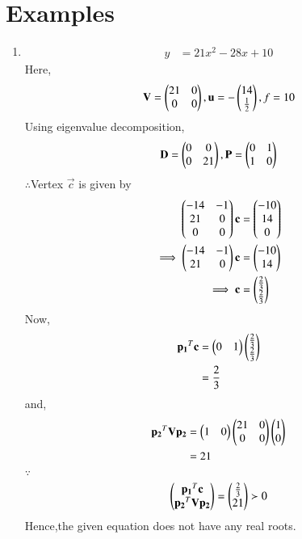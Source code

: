 \documentclass[journal,12pt,twocolumn]{IEEEtran}
\begin{document}
\section{Examples}
\begin{enumerate}
    \item 
    \begin{align}
        y &= 21x^2-28x+10
    \end{align}
    Here,
    \begin{align}
        \mathbf{V} = \begin{pmatrix}21 & 0 \\ 0 & 0\end{pmatrix},\mathbf{u}=-\begin{pmatrix}14 \\ \frac{1}{2}\end{pmatrix},f=10
    \end{align}
    Using eigenvalue decomposition,
    \begin{align}
        \mathbf{D} = \begin{pmatrix}0 & 0\\0 & 21\end{pmatrix} ,\mathbf{P}=\begin{pmatrix}0 & 1\\1 & 0\end{pmatrix}
    \end{align}
    $\therefore$Vertex $\vec{c}$ is given by
    \begin{align}
        \begin{pmatrix}-14 & -1 \\ 21 & 0 \\ 0 & 0\end{pmatrix}\mathbf{c} &= \begin{pmatrix}-10 \\ 14 \\ 0\end{pmatrix} \\
        \implies  \begin{pmatrix}-14 & -1 \\ 21 & 0\end{pmatrix}\mathbf{c} &= \begin{pmatrix}-10 \\ 14\end{pmatrix}
        \\
        \implies \mathbf{c} &= \begin{pmatrix}\frac{2}{3} \\ \frac{2}{3}\end{pmatrix}
    \end{align}
    Now,
    \begin{align}
        \mathbf{p_1}^T\mathbf{c} &= \begin{pmatrix}0 & 1\end{pmatrix}\begin{pmatrix}\frac{2}{3} \\ \frac{2}{3}\end{pmatrix}
        \\
        &= \frac{2}{3}
    \end{align}
    and,
    \begin{align}
        \mathbf{p_2}^T\mathbf{V}\mathbf{p_2} &= \begin{pmatrix}1 & 0\end{pmatrix}\begin{pmatrix}21 & 0\\0& 0\end{pmatrix}\begin{pmatrix}1 \\ 0\end{pmatrix}
        \\
        &= 21
    \end{align}
    $\because$
    \begin{align}
    \begin{pmatrix}\mathbf{p_1}^T\mathbf{c} \\ \mathbf{p_2}^T\mathbf{V}\mathbf{p_2}\end{pmatrix} = \begin{pmatrix}\frac{2}{3} \\ 21\end{pmatrix} \succ 0
    \end{align}
    Hence,the given equation does not have any real roots.
    

\end{enumerate}
\end{document}
